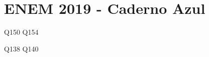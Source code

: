 \chapter{ENEM 2019 - Caderno Azul}

\setlength{\columnseprule}{0.5pt}
\setlength{\columnsep}{30pt}
\def\columnseprulecolor{\color{mygray}}
%
\begin{multicols}{2}
{Q150}
{Q154}

{Q138}
{Q140}



    
\end{multicols}



